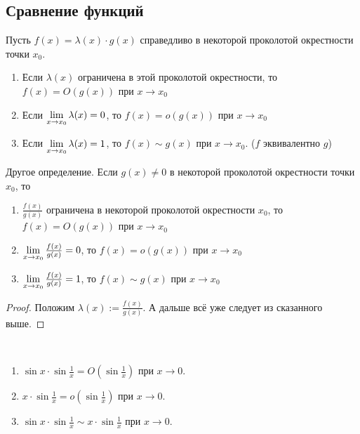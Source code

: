 \subsection{Сравнение функций}

\begin{definition}
	Пусть $f(x) = \lambda(x) \cdot g(x)$ справедливо в некоторой
	проколотой окрестности точки $x_0$.
	\begin{enumerate}
		\item Если $\lambda(x)$ ограничена в
		этой проколотой окрестности, то
		$f(x) = O(g(x))$ при $x \to x_0$
		
		\item Если $\lim\limits_{x \to x_0} \lambda(x) = 0$,
		то $f(x) = o(g(x))$ при $x \to x_0$
		
		\item Если $\lim\limits_{x \to x_0} \lambda(x) = 1$,
		то $f(x) \sim g(x)$ при $x \to x_0$. ($f$ эквивалентно $g$)
	\end{enumerate}
\end{definition}

\begin{theorem}
	Другое определение. Если $g(x) \neq 0$ в некоторой проколотой
	окрестности точки $x_0$, то
	\begin{enumerate}
		\item $\frac{f(x)}{g(x)}$ ограничена в
		некоторой проколотой окрестности $x_0$, то
		$f(x) = O(g(x))$ при $x \to x_0$
		
		\item $\lim\limits_{x \to x_0} \frac{f(x)}{g(x)} = 0$, то
		$f(x) = o(g(x))$ при $x \to x_0$
		
		\item $\lim\limits_{x \to x_0} \frac{f(x)}{g(x)} = 1$, то
		$f(x) \sim g(x)$ при $x \to x_0$
	\end{enumerate}
\end{theorem}

\begin{proof}
	Положим $\lambda(x) := \frac{f(x)}{g(x)}$. А дальше всё уже следует из сказанного выше.
\end{proof}

\begin{examples}~
	\begin{enumerate}
		\item $\sin x \cdot \sin \frac{1}{x} =
		O(\sin \frac{1}{x})$ при $x \to 0$.

		\item $x \cdot \sin \frac{1}{x}
		= o(\sin \frac{1}{x})$ при $x \to 0$.

		\item $\sin x \cdot \sin \frac{1}{x}
		\sim x \cdot \sin \frac{1}{x}$ при $x \to 0$.
	\end{enumerate}
\end{examples}

